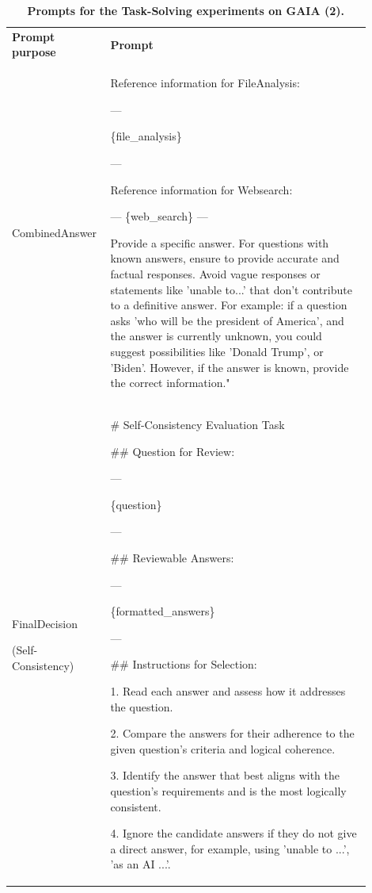\documentclass{article}
\theoremstyle{plain}
\theoremstyle{definition}
\theoremstyle{remark}
\begin{document}
\newpage
\begin{table}[t!]
  \centering
  \caption{\textbf{Prompts for the Task-Solving experiments on GAIA (2).}}
  \label{tab:gaia_prompts2}
  
  \renewcommand\tabcolsep{10pt}
  \renewcommand\arraystretch{1.3}
  \footnotesize 
  \begin{tabular}{|p{0.2\linewidth}|p{0.7\linewidth}|} 
    \Xhline{1.2pt}
    \rowcolor{champagne} 
    \textbf{Prompt purpose} & \textbf{Prompt} \\
 \Xhline{1.2pt}
    CombinedAnswer 
    &  
Reference information for FileAnalysis:

---

\{file\_analysis\}

---

Reference information for Websearch:

---
\{web\_search\}
---


Provide a specific answer. For questions with known answers, ensure to provide accurate and factual responses. Avoid vague responses or statements like 'unable to...' that don't contribute to a definitive answer. For example: if a question asks 'who will be the president of America', and the answer is currently unknown, you could suggest possibilities like 'Donald Trump', or 'Biden'. However, if the answer is known, provide the correct information." 
   \\  \Xhline{1.2pt}
   FinalDecision
   
   (Self-Consistency)
    &  \# Self-Consistency Evaluation Task

\#\#  Question for Review:

---

\{question\}

---

\#\#  Reviewable Answers:

---

\{formatted\_answers\}

---

\#\#  Instructions for Selection:

1. Read each answer and assess how it addresses the question.

2. Compare the answers for their adherence to the given question's criteria and logical coherence.

3. Identify the answer that best aligns with the question's requirements and is the most logically consistent.

4. Ignore the candidate answers if they do not give a direct answer, for example, using 'unable to ...', 'as an AI ...'.


\end{tabular}
\end{table}
\end{document}
